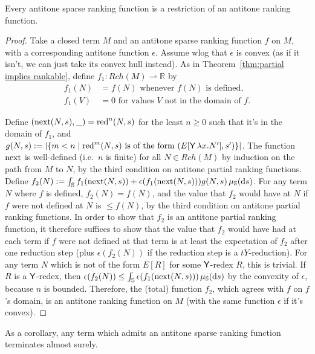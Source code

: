 \begin{therm}
\label{thm:antitone partial implies rankable}
  Every antitone sparse ranking function is a restriction of an antitone ranking function.
\end{therm}

\begin{proof}
  Take a closed term $M$ and an antitone sparse ranking function $f$ on $M$, with a corresponding antitone function $\epsilon$. Assume wlog that $\epsilon$ is convex (as if it isn't, we can just take its convex hull instead). As in Theorem~\ref{thm:partial implies rankable}, define $f_1 : Rch(M) \rightharpoonup \mathbb R$ by
  \begin{align*}
    f_1(N) &= f(N) \text{ whenever $f(N)$ is defined},\\
    f_1(V) &= 0 \text{ for values $V$ not in the domain of $f$.}
  \end{align*}


  Define $(\operatorname{next}(N,s),\_) = \operatorname{red}^n(N,s)$ for the least $n \geq 0$ such that it's in the domain of $f_1$, and $g(N,s) := \left | \{m < n \mid \operatorname{red}^m(N,s) \text{ is of the form } (E[\mathsf{Y}\, \lambda x. N'],s') \} \right |$. 
  The function $\operatorname{next}$ is well-defined (i.e.~$n$ is finite) for all $N \in Rch(M)$ by induction on the path from $M$ to $N$, by the third condition on antitone partial ranking functions. Define $f_2(N) := \int_{\mathbb{S}} f_1(\operatorname{next}(N,s)) + \epsilon(f_1(\operatorname{next}(N,s))) g(N,s) \, \mu_{{\mathbb{S}}}(\mathrm d s)$. For any term $N$ where $f$ is defined, $f_2(N) = f(N)$, and the value that $f_2$ would have at $N$ if $f$ were not defined at $N$ is $\leq f(N)$, by the third condition on antitone partial ranking functions. In order to show that $f_2$ is an antitone partial ranking function, it therefore suffices to show that the value that $f_2$ would have had at each term if $f$ were not defined at that term is at least the expectation of $f_2$ after one reduction step (plus $\epsilon(f_2(N))$ if the reduction step is a $tY$-reduction). For any term $N$ which is not of the form $E[R]$ for some $\mathsf{Y}$-redex $R$, this is trivial. If $R$ is a $\mathsf{Y}$-redex, then $\epsilon(f_2(N)) \leq \int_{\mathbb{S}} \epsilon(f_1(\operatorname{next}(N,s)))\, \mu_{{\mathbb{S}}}(\mathrm d s)$ by the convexity of $\epsilon$, because $n$ is bounded. Therefore, the (total) function $f_2$, which agrees with $f$ on $f$'s domain, is an antitone ranking function on $M$ (with the same function $\epsilon$ if it's convex).
\end{proof}
As a corollary, any term which admits an antitone sparse ranking function terminates almost surely.

